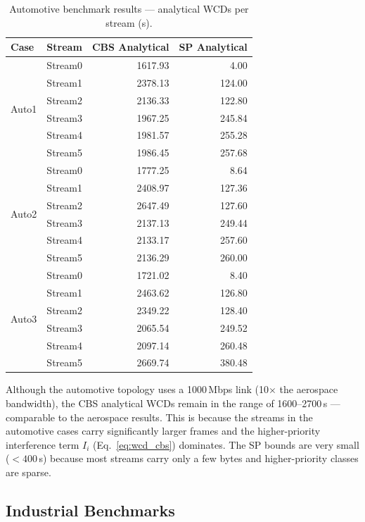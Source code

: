 \begin{table}[H]
\centering
\caption{Automotive benchmark results — analytical WCDs per stream (\textmu s).}
\label{tab:auto}
\begin{tabular}{llrr}
\toprule
Case & Stream & CBS Analytical & SP Analytical \\
\midrule
\multirow{6}{*}{Auto1}
 & Stream0 & 1617.93 & 4.00   \\
 & Stream1 & 2378.13 & 124.00 \\
 & Stream2 & 2136.33 & 122.80 \\
 & Stream3 & 1967.25 & 245.84 \\
 & Stream4 & 1981.57 & 255.28 \\
 & Stream5 & 1986.45 & 257.68 \\
\midrule
\multirow{6}{*}{Auto2}
 & Stream0 & 1777.25 & 8.64   \\
 & Stream1 & 2408.97 & 127.36 \\
 & Stream2 & 2647.49 & 127.60 \\
 & Stream3 & 2137.13 & 249.44 \\
 & Stream4 & 2133.17 & 257.60 \\
 & Stream5 & 2136.29 & 260.00 \\
\midrule
\multirow{6}{*}{Auto3}
 & Stream0 & 1721.02 & 8.40   \\
 & Stream1 & 2463.62 & 126.80 \\
 & Stream2 & 2349.22 & 128.40 \\
 & Stream3 & 2065.54 & 249.52 \\
 & Stream4 & 2097.14 & 260.48 \\
 & Stream5 & 2669.74 & 380.48 \\
\bottomrule
\end{tabular}
\end{table}

Although the automotive topology uses a 1000\,Mbps link (10$\times$ the aerospace bandwidth), the CBS analytical WCDs remain in the range of 1600--2700\,\textmu s — comparable to the aerospace results. This is because the streams in the automotive cases carry significantly larger frames and the higher-priority interference term $I_i$ (Eq.~\ref{eq:wcd_cbs}) dominates. The SP bounds are very small ($<400$\,\textmu s) because most streams carry only a few bytes and higher-priority classes are sparse.

\subsection{Industrial Benchmarks}

